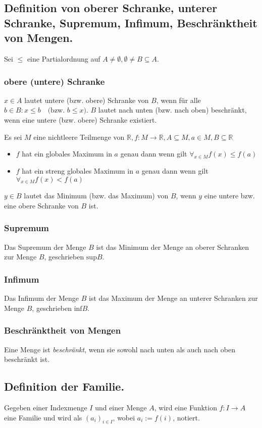 \subsection{Definition von oberer Schranke, unterer Schranke, Supremum, Infimum, Beschränktheit von Mengen.}
Sei $\leq$ eine Partialordnung auf $A \neq \emptyset , \emptyset \neq B \subseteq A$.

\subsubsection{obere (untere) Schranke}
$x \in A$ lautet untere (bzw. obere) Schranke von $B$, wenn für alle $b \in B: x \leq b \quad \text{(bzw. }b \leq x \text{)}$. $B$ lautet nach unten (bzw. nach oben) beschränkt, wenn eine untere (bzw. obere) Schranke existiert.

Es sei $M$ eine nichtleere Teilmenge von $\mathbb{R}, f:M\rightarrow\mathbb{R}, A \subseteq M, a\in M, B \subseteq\mathbb{R}$
\begin{itemize}
\item $f$ hat ein globales Maximum in $a$ genau dann wenn gilt $\forall_{x\in M}f(x)\leq f(a)$
\item $f$ hat ein streng globales Maximum in $a$ genau dann wenn gilt $\forall_{x\in M}f(x)<f(a)$
\end{itemize}

$y \in B$ lautet das Minimum (bzw. das Maximum) von $B$, wenn $y$ eine untere bzw. eine obere Schranke von $B$ ist.

\subsubsection{Supremum}
Das Supremum der Menge $B$ ist das Minimum der Menge an oberer Schranken zur Menge $B$, geschrieben $\text{sup}B$.

\subsubsection{Infimum}
Das Infimum der Menge $B$ ist das Maximum der Menge an unterer Schranken zur Menge $B$, geschrieben $\text{inf}B$.

\subsubsection{Beschränktheit von Mengen}
Eine Menge ist \textit{beschränkt}, wenn sie sowohl nach unten als auch nach oben beschränkt ist.

\subsection{Definition der Familie.}
Gegeben einer Indexmenge $I$ und einer Menge $A$, wird eine Funktion $f: I \longrightarrow A$ eine Familie und wird als $(a_i)_{i \in I}$, wobei $a_i := f(i)$, notiert.

